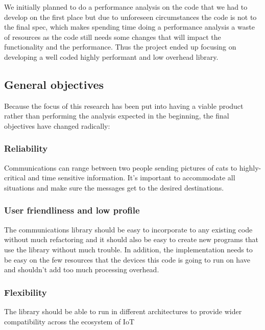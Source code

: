 We initially planned to do a performance analysis on the code that we had to develop on the first place but due to unforeseen circumstances the code is not to the final spec, which makes spending time doing a performance analysis a waste of resources as the code still needs some changes that will impact the functionality and the performance. Thus the project ended up focusing on developing a well coded highly performant and low overhead library.


\subsection{General objectives} \label{General objectives}
Because the focus of this research has been put into having a viable product rather than performing the analysis expected in the beginning, the final objectives have changed radically:
\subsubsection{Reliability}
Communications can range between two people sending pictures of cats to highly-critical and time sensitive information. It's important to accommodate all situations and make sure the messages get to the desired destinations.
\subsubsection{User friendliness and low profile}
The communications library should be easy to incorporate to any existing code without much refactoring and it should also be easy to create new programs that use the library without much trouble. In addition, the implementation needs to be easy on the few resources that the devices this code is going to run on have and shouldn't add too much processing overhead.
\subsubsection{Flexibility}
The library should be able to run in different architectures to provide wider compatibility across the ecosystem of IoT







	


